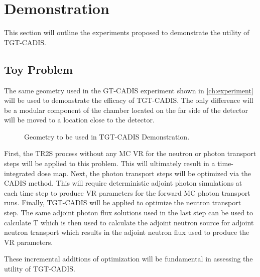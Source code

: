 \section{Demonstration} \label{sec:demo}
This section will outline the experiments proposed to demonstrate the utility
of TGT-CADIS.  

\subsection{Toy Problem}
The same geometry used in the GT-CADIS experiment shown in \ref{ch:experiment}
will be used to demonstrate the efficacy of TGT-CADIS.  The only difference
will be a modular component of the chamber located on the far side of the
detector will be moved to a location close to the detector.  

\begin{figure} \label{fig:mov_geom}
    \caption [Geometry for TGT-CADIS Demonstration]
	{Geometry to be used in TGT-CADIS Demonstration.}
\end{figure}

First, the TR2S process without any MC VR for the neutron or photon transport
steps will be applied to this problem.  This will ultimately result in a
time-integrated dose map.
Next, the photon transport steps will be optimized via the CADIS method.  This
will require deterministic adjoint photon simulations at each time step to
produce VR parameters for the forward MC photon transport runs.
Finally, TGT-CADIS will be applied to optimize the neutron transport step.  The
same adjoint photon flux solutions used in the last step can be used to
calculate T which is then used to calculate the adjoint neutron source for
adjoint neutron transport which results in the adjoint neutron flux used to
produce the VR parameters.

These incremental additions of optimization will be fundamental in assessing the
utility of TGT-CADIS. 




